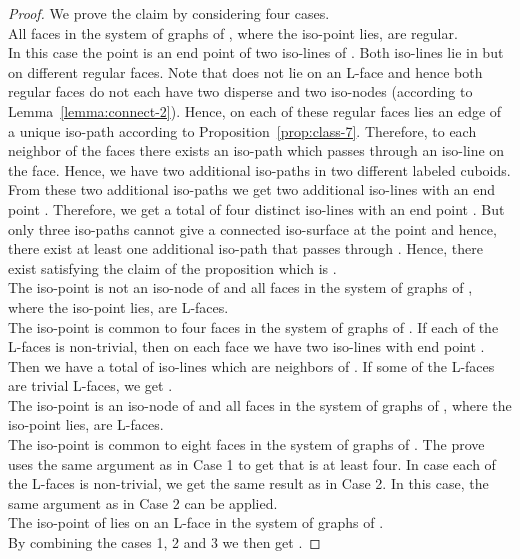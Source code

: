 \documentclass[a4paper,11pt]{article}
\begin{document}
\begin{proof}
We prove the claim by considering four cases. \\

All faces in the system of graphs of , where the iso-point  lies, are regular.\\

\noindent In this case the point  is an end point of two iso-lines of . Both iso-lines
lie in  but on different regular faces. Note that  does not lie on an L-face and hence both
regular faces do not each have two disperse and two iso-nodes (according to Lemma~\ref{lemma:connect-2}).
Hence, on each of these regular faces lies an edge of a unique iso-path according to
Proposition~\ref{prop:class-7}. Therefore, to each neighbor of the faces there exists an iso-path
which passes through an iso-line on the face. Hence, we have two additional iso-paths in two different
labeled cuboids. From these two additional iso-paths we get two additional iso-lines with an end point
. Therefore, we get a total of four distinct iso-lines with an end point . But only three
iso-paths cannot give a connected iso-surface at the point  and hence, there exist at least one
additional iso-path that passes through . Hence, there exist  satisfying
the claim of the proposition which is .\\

The iso-point  is not an iso-node of  and all faces in the system of
graphs of , where the iso-point  lies, are L-faces.\\

\noindent The iso-point  is common to four faces in the system of graphs of . If each of the
L-faces is non-trivial, then on each face we have two iso-lines with end point . Then we have a
total of   iso-lines which are neighbors of . If some of the L-faces are trivial L-faces,
we get .\\

The iso-point  is an iso-node of  and all faces in the system of graphs
of , where the iso-point  lies, are L-faces.\\

\noindent The iso-point  is common to eight faces in the system of graphs of . The prove uses
the same argument as in Case 1 to get that  is at least four. In case each of the L-faces is non-trivial,
we get the same result as in Case 2. In this case, the same argument as in Case 2 can be applied.\\

The iso-point  of  lies on an L-face in the system of graphs of .\\

\noindent By combining the cases 1, 2 and 3 we then get .
\end{proof}
\end{document}
